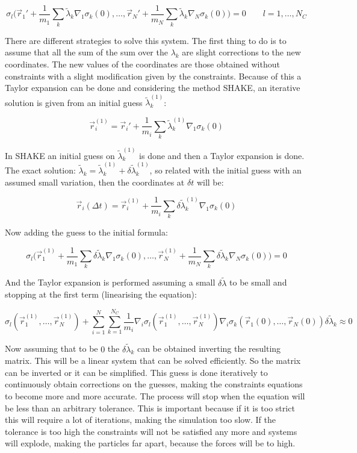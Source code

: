 		$$\sigma_l\biggl(\vec{r}_1' + \frac{1}{m_1}\sum\limits_k\tilde{\lambda}_k\nabla_1\sigma_k(0), \dots, \vec{r}_N' + \frac{1}{m_N}\sum\limits_k\tilde{\lambda}_k\nabla_N\sigma_k(0)\biggr) = 0\qquad l = 1, \dots, N_C$$

		There are different strategies to solve this system.
		The first thing to do is to assume that all the sum of the sum over the $\lambda_k$ are slight corrections to the new coordinates.
		The new values of the coordinates are those obtained without constraints with a slight modification given by the constraints.
		Because of this a Taylor expansion can be done and considering the method SHAKE, an iterative solution is given from an initial guess $\tilde{\lambda}_k^{(1)}$:

		$$\vec{r}_i^{(1)} = \vec{r}_i' + \frac{1}{m_i}\sum\limits_k\tilde{\lambda}_k^{(1)}\nabla_1\sigma_k(0)$$

		In SHAKE an initial guess on $\tilde{\lambda}_k^{(1)}$ is done and then a Taylor expansion is done.
		The exact solution: $\tilde{\lambda}_k = \tilde{\lambda}_k^{(1)} + \delta\tilde{\lambda}_k^{(1)}$, so related with the initial guess with an assumed small variation, then the coordinates at $\delta t$ will be:

		$$\vec{r}_i(\Delta t) = \vec{r}_i^{(1)} + \frac{1}{m_i}\sum\limits_k\delta\tilde{\lambda}_k^{(1)}\nabla_1\sigma_k(0)$$

		Now adding the guess to the initial formula:

		$$\sigma_l\biggl(\vec{r}_1^{(1)} + \frac{1}{m_1}\sum\limits_k\delta\tilde{\lambda}_k\nabla_1\sigma_k(0), \dots, \vec{r}_N^{(1)} + \frac{1}{m_N}\sum\limits_{k}\delta\tilde{\lambda}_k\nabla_N\sigma_k(0)\biggr) = 0$$

		And the Taylor expansion is performed assuming a small $\delta\tilde{\lambda}$ to be small and stopping at the first term (linearising the equation):

		$$\sigma_l(\vec{r}_1^{(1)}, \dots, \vec{r}_N^{(1)}) + \sum\limits_{i=1}^N\sum\limits_{k=1}^{N_C}\frac{1}{m_i}\nabla_i\sigma_l(\vec{r}_1^{(1)}, \dots, \vec{r}_N^{(1)})\nabla_i\sigma_k(\vec{r}_1(0), \dots, \vec{r}_N(0))\delta\tilde{\lambda}_k\approx 0$$

		Now assuming that to be $0$ the $\delta\tilde{\lambda}_k$ can be obtained inverting the resulting matrix.
		This will be a linear system that can be solved efficiently.
		So the matrix can be inverted or it can be simplified.
		This guess is done iteratively to continuously obtain corrections on the guesses, making the constraints equations to become more and more accurate.
		The process will stop when the equation will be less than an arbitrary tolerance.
		This is important because if it is too strict this will require a lot of iterations, making the simulation too slow.
		If the tolerance is too high the constraints will not be satisfied any more and systems will explode, making the particles far apart, because the forces will be to high.

